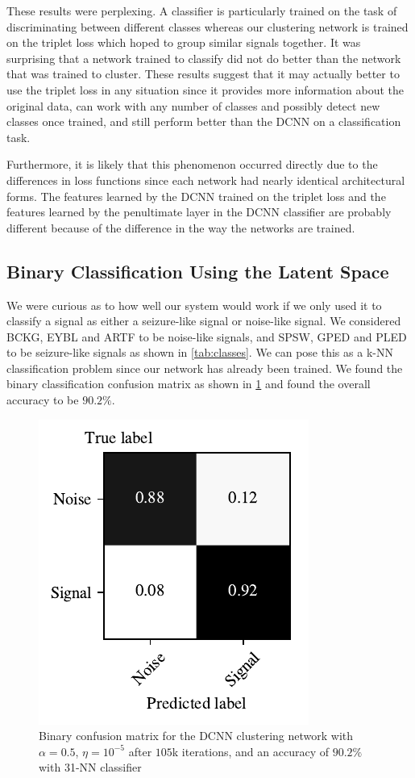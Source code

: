 These results were perplexing. A classifier is particularly trained on the task of discriminating between different classes whereas our clustering network is trained on the triplet loss which hoped to group similar signals together. It was surprising that a network trained to classify did not do better than the network that was trained to cluster. These results suggest that it may actually better to use the triplet loss in any situation since it provides more information about the original data, can work with any number of classes and possibly detect new classes once trained, and still perform better than the DCNN on a classification task. 

Furthermore, it is likely that this phenomenon occurred directly due to the differences in loss functions since each network had nearly identical architectural forms. The features learned by the DCNN trained on the triplet loss and the features learned by the penultimate layer in the DCNN classifier are probably different because of the difference in the way the networks are trained.

\subsection{Binary Classification Using the Latent Space}

We were curious as to how well our system would work if we only used it to classify a signal as either a seizure-like signal or noise-like signal.  We considered BCKG, EYBL and ARTF to be noise-like signals, and SPSW, GPED and PLED to be seizure-like signals as shown in \cref{tab:classes}. We can pose this as a k-NN classification problem since our network has already been trained. We found the binary classification confusion matrix as shown in \cref{fig:conf_mat_exp_pooled} and found the overall accuracy to be $90.2\%$.

\begin{figure}[!ht]
	\centering
	\includegraphics[width=0.425\linewidth]{pictures/conf_mat_exp_pooled.pdf}
	\caption[Binary confusion matrix for the DCNN clustering network]{Binary confusion matrix for the DCNN clustering network with $\alpha = 0.5$, $\eta = 10^{-5}$ after $105$k iterations, and an accuracy of $90.2\%$ with 31-NN classifier}\label{fig:conf_mat_exp_pooled}
\end{figure}

